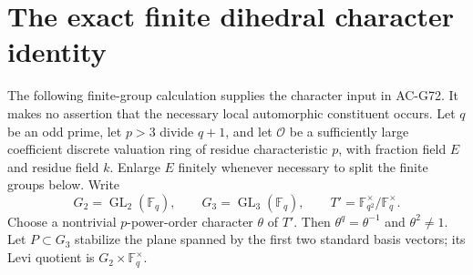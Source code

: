 \section{The exact finite dihedral character identity}
\label{sec:cubic-finite-type-character}

The following finite-group calculation supplies the character input in
AC-G72.  It makes no assertion that the necessary local automorphic
constituent occurs.  Let $q$ be an odd prime, let $p>3$ divide $q+1$,
and let $\mathcal O$ be a sufficiently large coefficient discrete
valuation ring of residue characteristic $p$, with fraction field $E$
and residue field $k$.  Enlarge $E$ finitely whenever necessary to
split the finite groups below.  Write
\[
 G_2=\operatorname{GL}_2(\mathbb F_q),\qquad
 G_3=\operatorname{GL}_3(\mathbb F_q),\qquad
 T'=\mathbb F_{q^2}^{\times}/\mathbb F_q^{\times}.
                                                        \tag{G72C.1}
\]
Choose a nontrivial $p$-power-order character $\theta$ of $T'$.  Then
$\theta^q=\theta^{-1}$ and $\theta^2\ne1$.  Let $P\subset G_3$
stabilize the plane spanned by the first two standard basis vectors;
its Levi quotient is $G_2\times\mathbb F_q^{\times}$.

